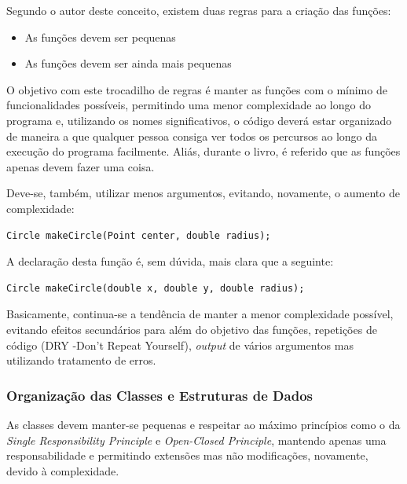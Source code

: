 \documentclass[10pt,portuguese]{article}
\begin{document}
\par Segundo o autor deste conceito, existem duas regras para a criação das funções:

\begin{itemize}
    \item As funções devem ser pequenas
    \item As funções devem ser ainda mais pequenas
\end{itemize}

\par O objetivo com este trocadilho de regras é manter as funções com o mínimo de funcionalidades possíveis, permitindo uma menor complexidade ao longo do programa e, utilizando os nomes significativos, o código deverá estar organizado de maneira a que qualquer pessoa consiga ver todos os percursos ao longo da execução do programa facilmente. Aliás, durante o livro, é referido que as funções apenas devem fazer uma coisa.

\par Deve-se, também, utilizar menos argumentos, evitando, novamente, o aumento de complexidade:
\begin{lstlisting}
Circle makeCircle(Point center, double radius);
\end{lstlisting}

\par A declaração desta função é, sem dúvida, mais clara que a seguinte:

\begin{lstlisting}
Circle makeCircle(double x, double y, double radius);
\end{lstlisting}

\par Basicamente, continua-se a tendência de manter a menor complexidade possível, evitando efeitos secundários para além do objetivo das funções, repetições de código (DRY -Don’t Repeat Yourself), \textit{output} de vários argumentos mas utilizando tratamento de erros.

\clearpage

\subsubsection{Organização das Classes e Estruturas de Dados}

\par As classes devem manter-se pequenas e respeitar ao máximo princípios como o da \textit{Single Responsibility Principle} e \textit{Open-Closed Principle}, mantendo apenas uma responsabilidade e permitindo extensões mas não modificações, novamente, devido à complexidade. 
\end{document}
